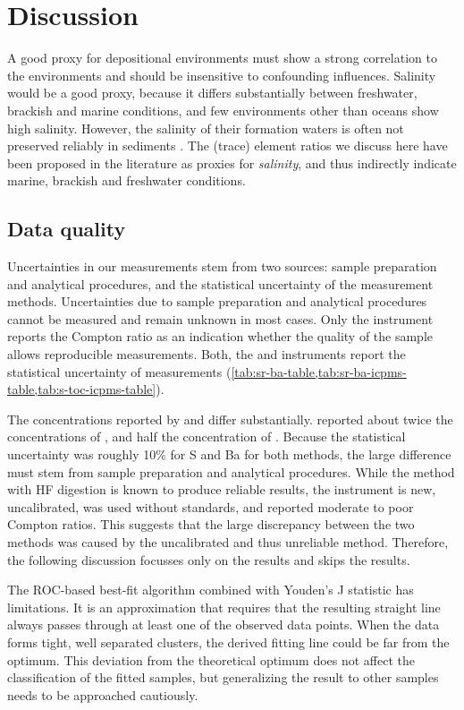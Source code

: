 \chapter{Discussion}

A good proxy for depositional environments must show a strong correlation to
the environments and should be insensitive to confounding influences.
Salinity would be a good proxy, because it differs substantially between freshwater, brackish and marine 
conditions, and few environments other than oceans show high salinity. However,
the salinity of their formation waters is often not preserved reliably in sediments \parencite{kharaka-2003}.
The (trace) element ratios we discuss here have been proposed in the literature as proxies
for \emph{salinity}, and thus indirectly indicate marine, brackish 
and freshwater conditions.

\section{Data quality}

Uncertainties in our measurements stem from two sources: sample preparation and analytical procedures,
and the statistical uncertainty of the measurement methods. Uncertainties due
to sample preparation and analytical procedures cannot be measured and remain unknown in most cases.
Only the \XRF instrument reports the Compton ratio as an indication whether the quality of the sample allows
reproducible measurements. 
Both, the \XRF and \ICPMS instruments report the statistical uncertainty of measurements (\cref{tab:sr-ba-table,tab:sr-ba-icpms-table,tab:s-toc-icpms-table}).

The concentrations reported by \XRF and \ICPMS differ substantially. 
\XRF reported about twice the concentrations of , and half the concentration of .
Because the statistical uncertainty was roughly 10\% for S and Ba for both methods, the large difference
must stem from sample preparation and analytical procedures.
While the \ICPMS method with HF digestion is known to produce reliable results,
the \XRF instrument is new, uncalibrated, was used without standards, and reported moderate to poor 
Compton ratios.
This suggests that the large discrepancy between the two methods was caused by the
uncalibrated and thus unreliable \XRF method. Therefore, the following discussion focusses
only on the \ICPMS results and skips the \XRF results.

The ROC-based best-fit algorithm combined with Youden's J statistic has limitations. 
It is an approximation that
requires that the resulting straight line always passes through at least one of the observed data points. 
When the data forms tight, well separated clusters, the derived fitting line could be far from the optimum.
This deviation from the theoretical optimum does not affect the classification of the fitted samples, 
but generalizing the result to other samples needs to be approached cautiously.


